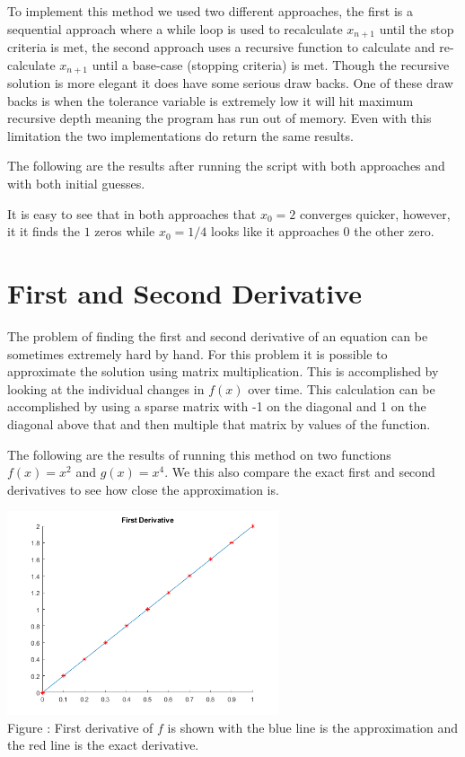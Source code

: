 \documentclass{article}
\begin{document}
To implement this method we used two different approaches, the first is a sequential approach where a while loop is used to recalculate $x_{n+1}$ until the stop criteria is met, the second approach uses a recursive function to calculate and re-calculate $x_{n+1}$ until a base-case (stopping criteria) is met. Though the recursive solution is more elegant it does have some serious draw backs. One of these draw backs is when the tolerance variable is extremely low it will hit maximum recursive depth meaning the program has run out of memory. Even with this limitation the two implementations do return the same results. 

The following are the results after running the script with both approaches and with both initial guesses. 



It is easy to see that in both approaches that $x_0 = 2$ converges quicker, however, it it finds the $1$ zeros while $x_0 = 1/4$ looks like it approaches $0$ the other zero. 

\section{First and Second Derivative}
The problem of finding the first and second derivative of an equation can be sometimes extremely hard by hand. For this problem it is possible to approximate the solution using matrix multiplication. This is accomplished by looking at the individual changes in $f(x)$ over time. This calculation can be accomplished by using a sparse matrix with -1 on the diagonal and 1 on the diagonal above that  and then multiple that matrix by values of the function. 

The following are the results of running this method on two functions $f(x) = x^2$ and $g(x) = x^4$. We this also compare the exact first and second derivatives to see how close the approximation is. 

\includegraphics[height=6cm]{f_fp}\\
Figure : First derivative of $f$ is shown with the blue line is the approximation and the red line is the exact derivative. 
\end{document}
